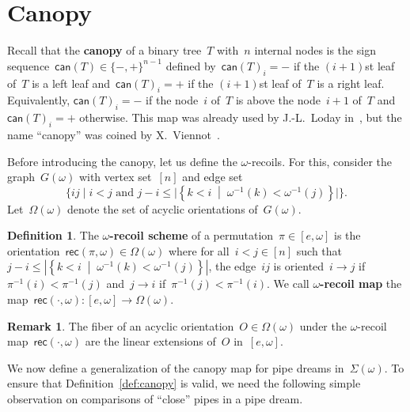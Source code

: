\documentclass{amsart}
\theoremstyle{definition}
\newtheorem{definition}[theorem]{Definition}
\newtheorem{remark}[theorem]{Remark}
\newcommand{\set}[2]{\left\{ #1 \;\middle|\; #2 \right\}} %
\newcommand{\bigset}[2]{\big\{ #1 \;|\; #2 \big\}} %
\newcommand{\defn}[1]{\textbf{\textsf{\color{PineGreen} #1}}} %
\newcommand{\acyclicPipeDreams}{\Sigma} %
\newcommand{\acyclicOrientations}{\Omega} %
\newcommand{\recoils}[2]{\mathsf{rec}(#1,#2)} %
\newcommand{\canopy}[1]{\mathsf{can}(#1)} %
\begin{document}
\section{Canopy}
\label{sec:canopy}

Recall that the \defn{canopy} of a binary tree~$T$ with~$n$ internal nodes is the sign sequence~${\canopy{T} \in \{{-},{+}\}^{n-1}}$ defined by~$\canopy{T}_i = {-}$ if the $(i+1)$st leaf of~$T$ is a left leaf and~$\canopy{T}_i = {+}$ if the $(i+1)$st leaf of~$T$ is a right leaf. Equivalently, $\canopy{T}_i = -$ if the node~$i$ of~$T$ is above the node~$i+1$ of~$T$ and~$\canopy{T}_i = +$ otherwise. This map was already used by J.-L.~Loday in~\cite{LodayRonco, Loday}, but the name ``canopy'' was coined by X.~Viennot~\cite{Viennot}.

Before introducing the canopy, let us define the $\omega$-recoils. For this, consider the graph~$G(\omega)$ with vertex set~$[n]$ and edge set
\[
\bigset{ij}{i < j \text{ and } j-i \le |\set{k < i}{\omega^{-1}(k) < \omega^{-1}(j)}|}.
\]
Let~$\acyclicOrientations(\omega)$ denote the set of acyclic orientations of~$G(\omega)$.

\begin{definition}
The \defn{$\omega$-recoil scheme} of a permutation~$\pi \in [e,\omega]$ is the orientation~${\recoils{\pi}{\omega} \in \acyclicOrientations(\omega)}$ where for all~$i < j \in [n]$ such that~$j-i \le |\set{k < i}{\omega^{-1}(k) < \omega^{-1}(j)}|$, the edge~$ij$ is oriented~$i \to j$ if~$\pi^{-1}(i) < \pi^{-1}(j)$ and~$j \to i$ if~$\pi^{-1}(j) < \pi^{-1}(i)$. We call \defn{$\omega$-recoil map} the map~$\recoils{\cdot}{\omega} : [e,\omega] \to \acyclicOrientations(\omega)$.
\end{definition}

\begin{remark}
The fiber of an acyclic orientation~$O \in \acyclicOrientations(\omega)$ under the $\omega$-recoil map~$\recoils{\cdot}{\omega}$ are the linear extensions of~$O$ in~$[e,\omega]$.
\end{remark}

We now define a generalization of the canopy map for pipe dreams in~$\acyclicPipeDreams(\omega)$. To ensure that Definition~\ref{def:canopy} is valid, we need the following simple observation on comparisons of ``close'' pipes in a pipe dream.
\end{document}
